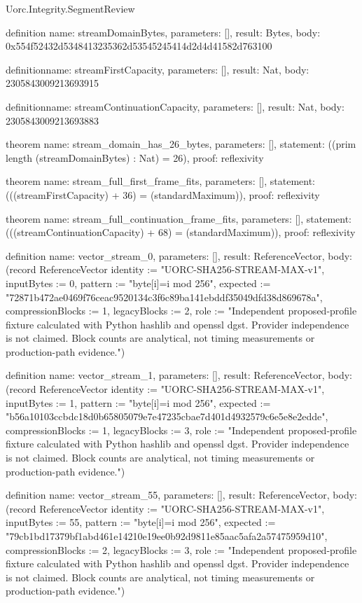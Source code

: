 \begin{lexlean}{Uorc.Integrity.SegmentReview}
\begin{semanticmodule}
definition{
  name: streamDomainBytes,
  parameters: [],
  result: Bytes,
  body: 0x554f52432d5348413235362d53545245414d2d4d41582d763100
}

definition{name: streamFirstCapacity, parameters: [], result: Nat, body: 2305843009213693915}

definition{name: streamContinuationCapacity, parameters: [], result: Nat, body: 2305843009213693883}

theorem{
  name: stream_domain_has_26_bytes,
  parameters: [],
  statement: ((prim length (streamDomainBytes) : Nat) = 26),
  proof: reflexivity{}
}

theorem{
  name: stream_full_first_frame_fits,
  parameters: [],
  statement: (((streamFirstCapacity) + 36) = (standardMaximum)),
  proof: reflexivity{}
}

theorem{
  name: stream_full_continuation_frame_fits,
  parameters: [],
  statement: (((streamContinuationCapacity) + 68) = (standardMaximum)),
  proof: reflexivity{}
}

definition{
  name: vector_stream_0,
  parameters: [],
  result: ReferenceVector,
  body: (record ReferenceVector {identity := "UORC-SHA256-STREAM-MAX-v1", inputBytes := 0, pattern := "byte[i]=i mod 256", expected := "72871b472ae0469f76ceac9520134c3f6c89ba141ebddf35049dfd38d869678a", compressionBlocks := 1, legacyBlocks := 2, role := "Independent proposed-profile fixture calculated with Python hashlib and openssl dgst. Provider independence is not claimed. Block counts are analytical, not timing measurements or production-path evidence."})
}

definition{
  name: vector_stream_1,
  parameters: [],
  result: ReferenceVector,
  body: (record ReferenceVector {identity := "UORC-SHA256-STREAM-MAX-v1", inputBytes := 1, pattern := "byte[i]=i mod 256", expected := "b56a10103ccbdc18d0b65805079e7e47235cbae7d401d4932579c6e5e8e2edde", compressionBlocks := 1, legacyBlocks := 3, role := "Independent proposed-profile fixture calculated with Python hashlib and openssl dgst. Provider independence is not claimed. Block counts are analytical, not timing measurements or production-path evidence."})
}

definition{
  name: vector_stream_55,
  parameters: [],
  result: ReferenceVector,
  body: (record ReferenceVector {identity := "UORC-SHA256-STREAM-MAX-v1", inputBytes := 55, pattern := "byte[i]=i mod 256", expected := "79cb1bd17379bf1abd461e14210e19ee0b92d9811e85aac5afa2a57475959d10", compressionBlocks := 2, legacyBlocks := 3, role := "Independent proposed-profile fixture calculated with Python hashlib and openssl dgst. Provider independence is not claimed. Block counts are analytical, not timing measurements or production-path evidence."})
}


\end{semanticmodule}
\end{lexlean}
